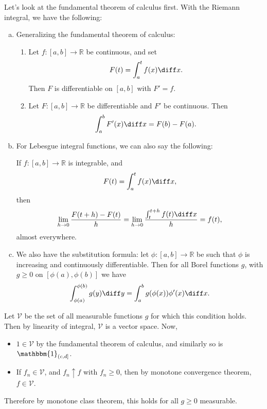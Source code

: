 \documentclass[12pt]{article}
\begin{document}
Let's look at the fundamental theorem of calculus first. With the Riemann integral, we have the following:

\begin{enumerate}[(a)]
	\item Generalizing the fundamental theorem of calculus:
\begin{enumerate}[(1)]
	\item Let $f : [a, b] \to \mathbb{R}$ be continuous, and set 
		\[
		F(t) = \int_a^t f(x) \diff x.
		\]
		Then $F$ is differentiable on $[a, b]$ with $F' = f$.
	\item Let $F : [a, b] \to \mathbb{R}$ be differentiable and $F'$ be continuous. Then
		\[
		\int_a^b F'(x) \diff x = F(b) - F(a).
		\]
\end{enumerate}

\item For Lebesgue integral functions, we can also say the following:

If $f : [a, b] \to \mathbb{R}$ is integrable, and 
\[
F(t) = \int_a^t f(x) \diff x,
\]
then
\[
	\lim_{h \to 0} \frac{F(t+h) - F(t)}{h} = \lim_{h \to 0} \frac{\int_t^{t+h} f(t) \diff x}{h} = f(t),
\]
almost everywhere.

\item We also have the substitution formula: let $\phi : [a, b] \to \mathbb{R}$ be such that $\phi$ is increasing and continuously differentiable. Then for all Borel functions $g$, with $g \geq 0$ on $[\phi(a), \phi(b)]$ we have
	\[
	\int_{\phi(a)}^{\phi(b)}g(y) \diff y = \int_a^b g(\phi(x)) \phi'(x) \diff x.
	\]
\end{enumerate}

\begin{proofbox}
	Let $\mathcal{V}$ be the set of all measurable functions $g$ for which this condition holds. Then by linearity of integral, $\mathcal{V}$ is a vector space. Now,
	\begin{itemize}
		\item $1 \in \mathcal{V}$ by the fundamental theorem of calculus, and similarly so is $\mathbbm{1}_{(c,d]}$.
		\item If $f_n \in \mathcal{V}$, and $f_n \uparrow f$ with $f_n \geq 0$, then by monotone convergence theorem, $f \in \mathcal{V}$.
	\end{itemize}
	Therefore by monotone class theorem, this holds for all $g \geq 0$ measurable.
\end{proofbox}
\end{document}
